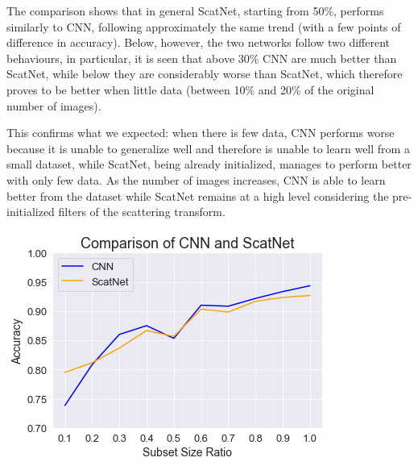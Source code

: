 \documentclass[11pt]{article}
\newenvironment{Figure}
  {\par\medskip\noindent\minipage{\linewidth}}
  {\endminipage\par\medskip}
\begin{document}
\begin{multicols*}{2}
The comparison shows that in general ScatNet, starting from 50\%, performs similarly to CNN, following approximately the same trend (with a few points of difference in accuracy). Below, however, the two networks follow two different behaviours, in particular, it is seen that above 30\% CNN are much better than ScatNet, while below they are considerably worse than ScatNet, which therefore proves to be better when little data (between 10\% and 20\% of the original number of images).

This confirms what we expected: when there is few data, CNN performs worse because it is unable to generalize well and therefore is unable to learn well from a small dataset, while ScatNet, being already initialized, manages to perform better with only few data. As the number of images increases, CNN is able to learn better from the dataset while ScatNet remains at a high level considering the pre-initialized filters of the scattering transform.

\begin{Figure}
    \centering
    \includegraphics[width=0.8\linewidth]{images/comparison.png}
    \label{fig:accuracy_comparison}
\end{Figure}


\end{multicols*}
\end{document}
